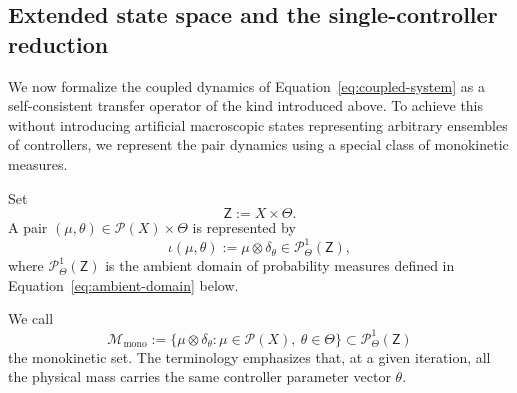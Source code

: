 \documentclass[11pt]{article}
\theoremstyle{definition}
\theoremstyle{remark}
\newcommand{\Prob}{\mathcal{P}}
\newcommand{\ProbThetaOne}{\mathcal{P}_{\Theta}^{1}}
\newcommand{\ThetaSet}{\Theta}
\newcommand{\Z}{\mathsf{Z}}
\newcommand{\Mmono}{\mathscr{M}_{\mathrm{mono}}}
\begin{document}
\subsection{Extended state space and the single-controller reduction}

We now formalize the coupled dynamics of Equation~\eqref{eq:coupled-system} as a self-consistent transfer operator of the kind introduced above. To achieve this without introducing artificial macroscopic states representing arbitrary ensembles of controllers, we represent the pair dynamics using a special class of monokinetic measures.

Set
\begin{equation}
  \Z:=X\times\ThetaSet.
  \label{eq:extended-space}
\end{equation}
A pair \((\mu,\theta)\in\Prob(X)\times\ThetaSet\) is represented by
\begin{equation}
  \iota(\mu,\theta)
  :=\mu\otimes\delta_\theta
  \in\ProbThetaOne(\Z),
  \label{eq:embedding}
\end{equation}
where \(\ProbThetaOne(\Z)\) is the ambient domain of probability measures defined in Equation~\eqref{eq:ambient-domain} below.


We call
\begin{equation}
  \Mmono
  :=\{\mu\otimes\delta_\theta:
       \mu\in\Prob(X),\ \theta\in\ThetaSet\}
  \subset\ProbThetaOne(\Z)
  \label{eq:monokinetic-set}
\end{equation}
the monokinetic set.  The terminology emphasizes that, at a given iteration,
all the physical mass carries the same controller parameter vector \(\theta\).
\end{document}
